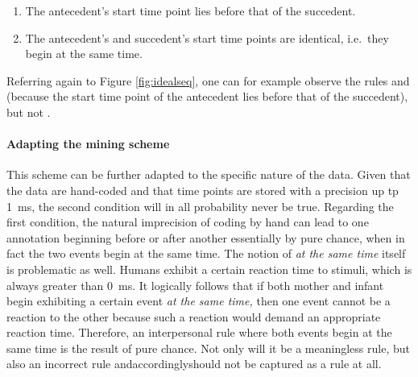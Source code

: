\begin{enumerate}
	\item The antecedent's start time point lies before that of the succedent.
	\item The antecedent's and succedent's start time points are identical, i.e.\ they begin at the same time.
\end{enumerate}

Referring again to Figure \ref{fig:idealseq}, one can for example observe the rules  and  (because the start time point of the antecedent lies before that of the succedent), but not .

\paragraph{Adapting the mining scheme}
This scheme can be further adapted to the specific nature of the data. Given that the data are hand-coded and that time points are stored with a precision up tp 1~ms, the second condition will in all probability never be true. Regarding the first condition, the natural imprecision of coding by hand can lead to one annotation beginning before or after another essentially by pure chance, when in fact the two events begin at the same time. The notion of \emph{at the same time} itself is problematic as well. Humans exhibit a certain reaction time to stimuli, which is always greater than 0~ms. It logically follows that if both mother and infant begin exhibiting a certain event \emph{at the same time,} then one event cannot be a reaction to the other because such a reaction would demand an appropriate reaction time. Therefore, an interpersonal rule where both events begin at the same time is the result of pure chance. Not only will it be a meaningless rule, but also an incorrect rule and\dash accordingly\dash should not be captured as a rule at all.

